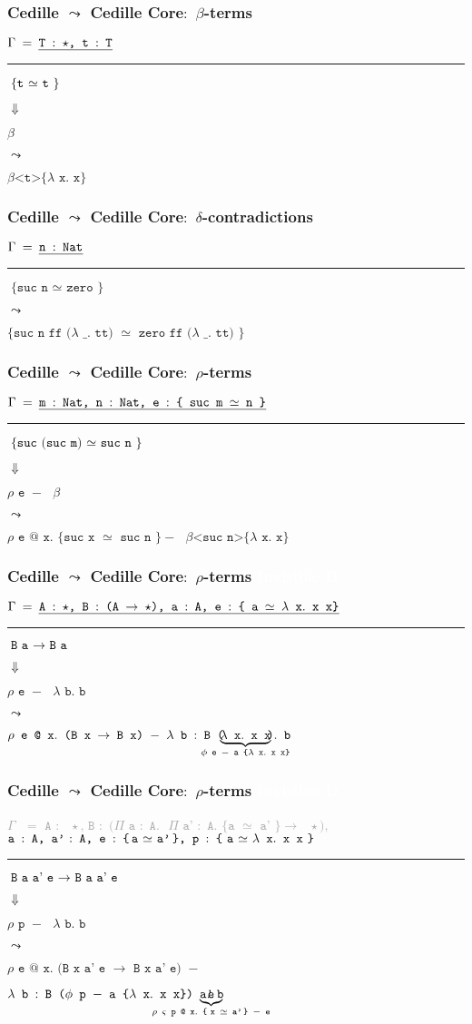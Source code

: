 \documentclass[11pt]{beamer}
\newcommand{\cedtext}[1]{\emph{$\texttt{#1}$}}
\newcommand{\lamxxx}[0]{$\lambda$ x$.$ x x}
\newcommand{\checkagainst}[2]{
\textcolor{black}{\cedtext{#2}}


\textcolor{black}{$\Downarrow$}


\textcolor{colorced}{\cedtext{#1}}
}
\newcommand{\elabrule}[4]{
\begin{frame}[t]
\frametitle{\textcolor{colorced}{Cedille} $\leadsto$ \textcolor{colorcedcore}{Cedille Core}$:$ {#1}}
\vspace{1cm}
\textcolor{darkgray}{\cedtext{$\Gamma$ $=$ \cedtext{#2}}}
\noindent\rule{\textwidth}{0.2pt}

\vfill
\begin{center}
#3

$\leadsto$

\textcolor{colorcedcore}{\cedtext{#4}}

\end{center}
\vfill

\end{frame}
}
\newcommand{\elabruleb}[6]{
\begin{frame}[t]
\frametitle{\textcolor{colorced}{Cedille} $\leadsto$ \textcolor{colorcedcore}{Cedille Core}$:$ {#1}}
\vspace{1cm}
\textcolor{darkgray}{\cedtext{$\Gamma$ $=$} \cedtext{#2}}
\newline
\qquad\textcolor{darkgray}{\qquad\cedtext{#3}}
\noindent\rule{\textwidth}{0.2pt}

\vfill
\begin{center}
#4

$\leadsto$

\textcolor{colorcedcore}{\cedtext{#5}}

\textcolor{colorcedcore}{\cedtext{#6}}

\end{center}
\vfill

\end{frame}

}
\begin{document}
\elabrule
  {$\beta$-terms}
  {T $:$ $\star$, t $:$ T}
  {\checkagainst{$\beta$}{\{ t $\simeq$ t \}}}
  {$\beta$<t>\{$\lambda$ x$.$ x\}}

\elabrule
  {$\delta$-contradictions}
  {n $:$ Nat}
  {\textcolor{colorced}{\cedtext{\{ suc n $\simeq$ zero \}}}}
  {\{ suc n ff ($\lambda$ \_$.$ tt) $\simeq$ zero ff ($\lambda$ \_$.$ tt) \}}

\elabrule
  {$\rho$-terms}
  {m $:$ Nat, n $:$ Nat, e $:$ \{ suc m $\simeq$ n \}}
  {\checkagainst{$\rho$ e $-$ $\beta$}{\{ suc (suc m) $\simeq$ suc n \}}}
  {$\rho$ e @ x$.$ \{ suc x $\simeq$ suc n \} $-$ $\beta$<suc n>\{$\lambda$ x$.$ x\}}


\elabrule
  {$\rho$-terms \textcolor{white}{Invisible B}}
  {A $:$ $\star$, B $:$ (A $\rightarrow$ $\star$), a $:$ A, e $:$ \{ a $\simeq$ \lamxxx \}}
  {\checkagainst{$\rho$ e $-$ $\lambda$ b$.$ b}{B a $\rightarrow$ B a}}
  {$\rho$ e @ x$.$ (B x $\rightarrow$ B x) $-$ $\lambda$ b $:$ B (\hspace{-18pt}$\underbrace{\text{\lamxxx}}_{\text{$\phi$ e $-$ a \{\lamxxx\}}}$\hspace{-18pt})$.$ b}


\elabruleb
  {$\rho$-terms \textcolor{white}{Invisible D}}
  {A $:$ $\star$, B $:$ ($\Pi$ a $:$ A$.$ $\Pi$ a' $:$ A$.$ \{ a $\simeq$ a' \} $\rightarrow$ $\star$),}
  {a $:$ A, a'\! $:$ A, e $:$ \{\!\! a\! $\simeq$\! a'\!\! \}, p $:$ \{\! a\! $\simeq$\! \lamxxx\! \}}
  {\checkagainst{$\rho$ p $-$ $\lambda$ b$.$ b}{B a a' e $\rightarrow$ B a a' e}}
  {$\rho$ e @ x$.$ (B x a' e $\rightarrow$ B x a' e) $-$}
  {$\lambda$ b $:$ B ($\phi$ p $-$ a \{\lamxxx\}) a'\!\! \hspace{-50pt}$\underbrace{\text{e}}_{\text{$\rho$ $\varsigma$ p @ x$.$ \{\! x $\simeq$ a'\!\! \} $-$ e}}$\hspace{-50pt}$.$ b}
\end{document}
